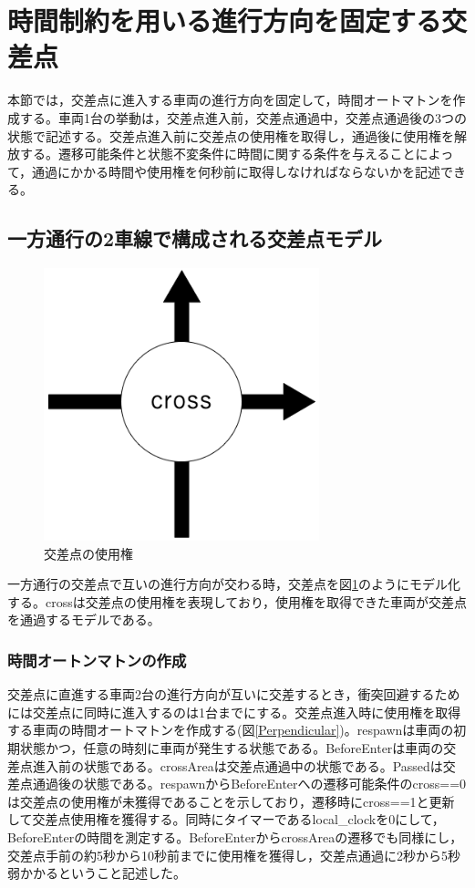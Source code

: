 \documentclass{tpu-sotu}
\begin{document}
	
	\section{時間制約を用いる進行方向を固定する交差点}
	本節では，交差点に進入する車両の進行方向を固定して，時間オートマトン\cite{u3}を作成する。車両1台の挙動は，交差点進入前，交差点通過中，交差点通過後の3つの状態で記述する。交差点進入前に交差点の使用権を取得し，通過後に使用権を解放する。遷移可能条件と状態不変条件に時間に関する条件を与えることによって，通過にかかる時間や使用権を何秒前に取得しなければならないかを記述できる。
	\subsection{一方通行の2車線で構成される交差点モデル}
	\begin{figure}[htbp]
	\centering
	\includegraphics[width=80mm]{SimplePerpendicular.png}
	\caption{交差点の使用権}
	\label{SimpleP}
	\end{figure}
	一方通行の交差点で互いの進行方向が交わる時，交差点を図\ref{SimpleP}のようにモデル化する。crossは交差点の使用権を表現しており，使用権を取得できた車両が交差点を通過するモデルである。
	\subsubsection{時間オートンマトンの作成}
	交差点に直進する車両2台の進行方向が互いに交差するとき，衝突回避するためには交差点に同時に進入するのは1台までにする。交差点進入時に使用権を取得する車両の時間オートマトンを作成する(図\ref{Perpendicular})。respawnは車両の初期状態かつ，任意の時刻に車両が発生する状態である。BeforeEnterは車両の交差点進入前の状態である。crossAreaは交差点通過中の状態である。Passedは交差点通過後の状態である。respawnからBeforeEnterへの遷移可能条件のcross==0は交差点の使用権が未獲得であることを示しており，遷移時にcross==1と更新して交差点使用権を獲得する。同時にタイマーであるlocal\_clockを0にして，BeforeEnterの時間を測定する。BeforeEnterからcrossAreaの遷移でも同様にし，交差点手前の約5秒から10秒前までに使用権を獲得し，交差点通過に2秒から5秒弱かかるということ記述した。
	
\end{document}
